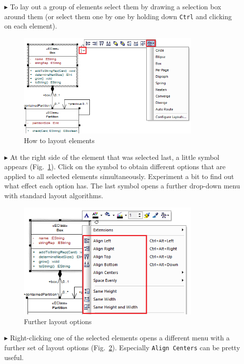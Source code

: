 \begin{enumerate}
\item[$\blacktriangleright$] To lay out a group of elements select them by drawing a selection box around them (or select them one by one by holding down \texttt{Ctrl} and clicking on each element).
\begin{figure}[htbp]
\begin{center} 
  \includegraphics[width=0.85\textwidth]{pics/tricks/layoutElements/layoutElements1}
  \caption{How to layout elements}  
  \label{fig_layout01}
\end{center}
\end{figure}
 
\item[$\blacktriangleright$] At the right side of the element that was selected last, a little symbol appears (Fig.~\ref{fig_layout01}).
Click on the symbol to obtain different options that are applied to all selected elements simultaneously.
Experiment a bit to find out what effect each option has.
The last symbol opens a further drop-down menu with standard layout algorithms.

\begin{figure}[htbp]
\begin{center}  
  \includegraphics[width=0.85\textwidth]{pics/tricks/layoutElements/layoutElements2}
  \caption{Further layout options}  
  \label{fig_layout02} 
\end{center}
\end{figure}

\item[$\blacktriangleright$] Right-clicking one of the selected elements opens a different menu with a further set of layout options (Fig.~\ref{fig_layout02}).
Especially \texttt{Align Centers} can be pretty useful.
\end{enumerate}
  
